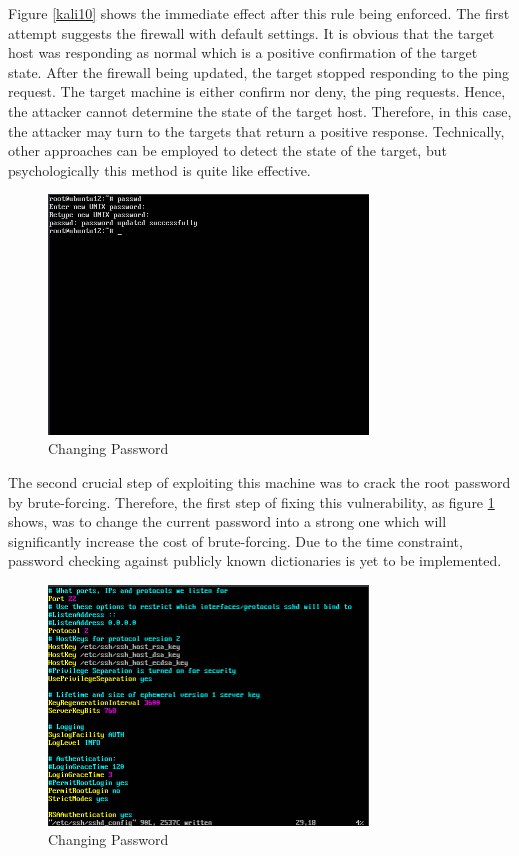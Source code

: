 \documentclass{article}
\begin{document}
Figure \ref{kali10} shows the immediate effect after this rule being enforced. The first attempt suggests the firewall 
with default settings. It is obvious that the target host was responding as normal which is a positive 
confirmation of the target state. After the firewall being updated, the target stopped responding to the ping request. 
The target machine is either confirm nor deny, the ping requests. Hence, the attacker cannot determine the state of 
the target host. Therefore, in this case, the attacker may turn to the targets that return a positive response. 
Technically, other approaches can be employed to detect the state of the target, but psychologically this method is 
quite like effective.

\begin{figure}[H]
  \includegraphics[width=8.5cm]{ubuntu8}
  \caption{Changing Password}
  \label{ubuntu8}
\end{figure}

The second crucial step of exploiting this machine was to crack the root password by brute-forcing. 
Therefore, the first step of fixing this vulnerability, as figure \ref{ubuntu8} shows, was to change the current password into a strong one which 
will significantly increase the cost of brute-forcing. Due to the time constraint, password checking against 
publicly known dictionaries is yet to be implemented.

\begin{figure}[H]
  \includegraphics[width=8.5cm]{ubuntu6}
  \caption{Changing Password}
  \label{ubuntu6}
\end{figure}
\end{document}
